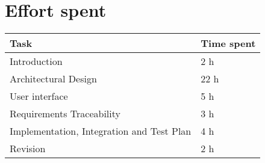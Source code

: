 \chapter{Effort spent}
\begin{tabular}{|l|l|}
	\hline
	Task & Time spent\\
	\hline
	Introduction & 2 h\\
	\hline
	Architectural Design & 22 h\\
	\hline
	User interface & 5 h\\
	\hline
	Requirements Traceability & 3 h\\
	\hline
	Implementation, Integration and Test Plan & 4 h\\
	\hline
	Revision & 2 h\\
	\hline
\end{tabular}